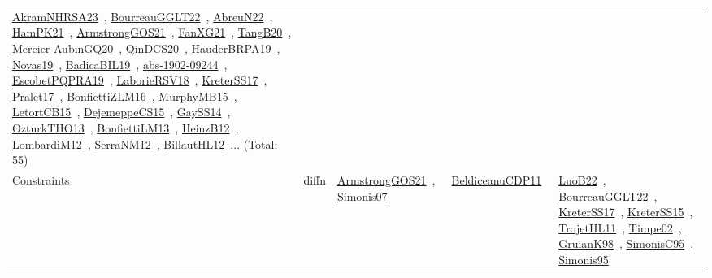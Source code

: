 {\begin{longtable}{lp{3cm}>{\raggedright\arraybackslash}p{6cm}>{\raggedright\arraybackslash}p{6cm}>{\raggedright\arraybackslash}p{8cm}}
\href{articles/AkramNHRSA23.pdf}{AkramNHRSA23}~\cite{AkramNHRSA23}, \href{articles/BourreauGGLT22.pdf}{BourreauGGLT22}~\cite{BourreauGGLT22}, \href{articles/AbreuN22.pdf}{AbreuN22}~\cite{AbreuN22}, \href{articles/HamPK21.pdf}{HamPK21}~\cite{HamPK21}, \href{papers/ArmstrongGOS21.pdf}{ArmstrongGOS21}~\cite{ArmstrongGOS21}, \href{articles/FanXG21.pdf}{FanXG21}~\cite{FanXG21}, \href{papers/TangB20.pdf}{TangB20}~\cite{TangB20}, \href{papers/Mercier-AubinGQ20.pdf}{Mercier-AubinGQ20}~\cite{Mercier-AubinGQ20}, \href{articles/QinDCS20.pdf}{QinDCS20}~\cite{QinDCS20}, \href{articles/HauderBRPA19.pdf}{HauderBRPA19}~\cite{HauderBRPA19}, \href{articles/Novas19.pdf}{Novas19}~\cite{Novas19}, \href{papers/BadicaBIL19.pdf}{BadicaBIL19}~\cite{BadicaBIL19}, \href{articles/abs-1902-09244.pdf}{abs-1902-09244}~\cite{abs-1902-09244}, \href{articles/EscobetPQPRA19.pdf}{EscobetPQPRA19}~\cite{EscobetPQPRA19}, \href{articles/LaborieRSV18.pdf}{LaborieRSV18}~\cite{LaborieRSV18}, \href{articles/KreterSS17.pdf}{KreterSS17}~\cite{KreterSS17}, \href{papers/Pralet17.pdf}{Pralet17}~\cite{Pralet17}, \href{papers/BonfiettiZLM16.pdf}{BonfiettiZLM16}~\cite{BonfiettiZLM16}, \href{papers/MurphyMB15.pdf}{MurphyMB15}~\cite{MurphyMB15}, \href{articles/LetortCB15.pdf}{LetortCB15}~\cite{LetortCB15}, \href{papers/DejemeppeCS15.pdf}{DejemeppeCS15}~\cite{DejemeppeCS15}, \href{papers/GaySS14.pdf}{GaySS14}~\cite{GaySS14}, \href{articles/OzturkTHO13.pdf}{OzturkTHO13}~\cite{OzturkTHO13}, \href{papers/BonfiettiLM13.pdf}{BonfiettiLM13}~\cite{BonfiettiLM13}, \href{papers/HeinzB12.pdf}{HeinzB12}~\cite{HeinzB12}, \href{articles/LombardiM12.pdf}{LombardiM12}~\cite{LombardiM12}, \href{papers/SerraNM12.pdf}{SerraNM12}~\cite{SerraNM12}, \href{papers/BillautHL12.pdf}{BillautHL12}~\cite{BillautHL12}... (Total: 55)\\
Constraints & diffn & \href{papers/ArmstrongGOS21.pdf}{ArmstrongGOS21}~\cite{ArmstrongGOS21}, \href{articles/Simonis07.pdf}{Simonis07}~\cite{Simonis07} & \href{articles/BeldiceanuCDP11.pdf}{BeldiceanuCDP11}~\cite{BeldiceanuCDP11} & \href{papers/LuoB22.pdf}{LuoB22}~\cite{LuoB22}, \href{articles/BourreauGGLT22.pdf}{BourreauGGLT22}~\cite{BourreauGGLT22}, \href{articles/KreterSS17.pdf}{KreterSS17}~\cite{KreterSS17}, \href{papers/KreterSS15.pdf}{KreterSS15}~\cite{KreterSS15}, \href{articles/TrojetHL11.pdf}{TrojetHL11}~\cite{TrojetHL11}, \href{articles/Timpe02.pdf}{Timpe02}~\cite{Timpe02}, \href{papers/GruianK98.pdf}{GruianK98}~\cite{GruianK98}, \href{papers/SimonisC95.pdf}{SimonisC95}~\cite{SimonisC95}, \href{papers/Simonis95.pdf}{Simonis95}~\cite{Simonis95}\\

\end{longtable}}
